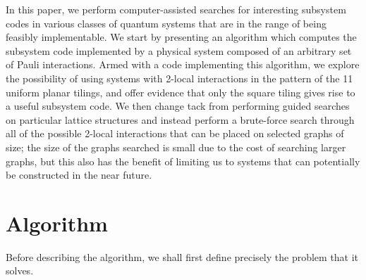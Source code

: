 \documentclass[twocolumn,showpacs,preprintnumbers,amsmath,amssymb,nofootinbib,pra,floatfix]{revtex4}
\begin{document}
In this paper, we perform computer-assisted searches for interesting subsystem codes in various classes of quantum systems that are in the range of being feasibly implementable.  We start by presenting an algorithm which computes the subsystem code implemented by a physical system composed of an arbitrary set of Pauli interactions.  Armed with a code implementing this algorithm, we explore the possibility of using systems with 2-local interactions in the pattern of the 11 uniform planar tilings, and offer evidence that only the square tiling gives rise to a useful subsystem code.  We then change tack from performing guided searches on particular lattice structures and instead perform a brute-force search through all of the possible 2-local interactions that can be placed on selected graphs of  size; the size of the graphs searched is small due to the cost of searching larger graphs, but this also has the benefit of limiting us to systems that can potentially be constructed in the near future.
\section{Algorithm}

Before describing the algorithm, we shall first define precisely the problem that it solves.
\end{document}

